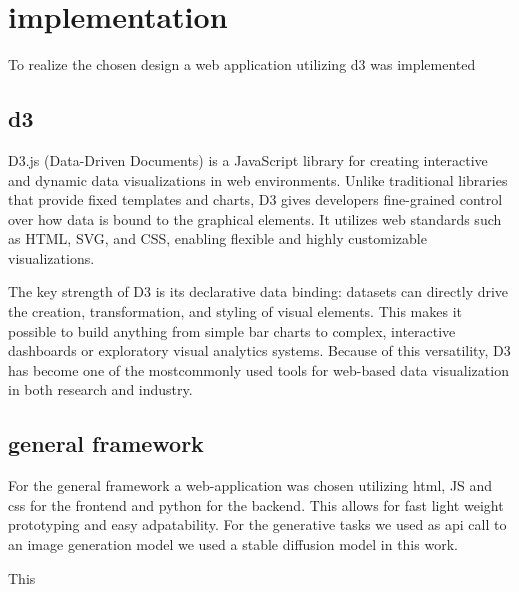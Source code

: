 \documentclass[
  a4paper,  %
  twoside,  %
  bibliography=totoc,
  headsepline,
  cleardoublepage=empty,
  parskip=half,
  draft=false
]{scrbook}
\begin{document}
\chapter{implementation}
To realize the chosen design a web application utilizing d3 was implemented
\section{d3}
D3.js (Data-Driven Documents) is a JavaScript library for creating interactive and dynamic data visualizations in web environments. Unlike traditional libraries that provide fixed templates and charts, D3 gives developers fine-grained control over how data is bound to the graphical elements. It utilizes web standards such as HTML, SVG, and CSS, enabling flexible and highly customizable visualizations.

The key strength of D3 is its declarative data binding: datasets can directly drive the creation, transformation, and styling of visual elements. This makes it possible to build anything from simple bar charts to complex, interactive dashboards or exploratory visual analytics systems. Because of this versatility, D3 has become one of the mostcommonly used tools for web-based data visualization in both research and industry.

\section{general framework}
For the general framework a web-application was chosen utilizing html, JS and css for the frontend and python for the backend.
This allows for fast light weight prototyping and easy adpatability. For the generative tasks we used as api call to an image generation model we used a stable diffusion model \cite{stableDiffusion} in this work.
                                                                        
This 
\end{document}
